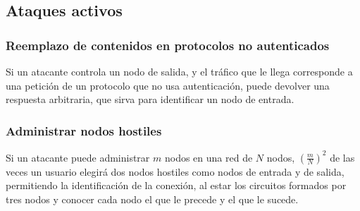 \documentclass[
  a4paper,
  12pt,
  spanish,
]{scrartcl}
\begin{document}
\subsection{Ataques activos}

\subsubsection{Reemplazo de contenidos en protocolos no autenticados}

Si un atacante controla un nodo de salida, y el tráfico que le llega corresponde a una petición
de un protocolo que no usa autenticación, puede devolver una respuesta arbitraria, que sirva para
identificar un nodo de entrada.

\subsubsection{Administrar nodos hostiles}

Si un atacante puede administrar $m$ nodos en una red de $N$ nodos, $\left(\frac{m}{N}\right)^2$ de las veces
un usuario elegirá dos nodos hostiles como nodos de entrada y de salida, permitiendo la identificación de la conexión,
al estar los circuitos formados por tres nodos y conocer cada nodo el que le precede y el que le sucede.




\newpage
\printbibliography
\end{document}
